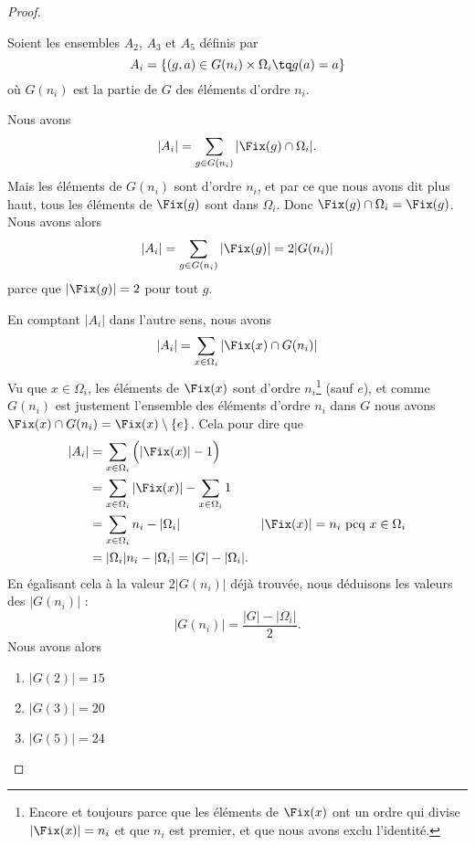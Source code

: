 \begin{proof}
\begin{subproof}
		Soient les ensembles \( A_2\), \( A_3\) et \( A_5\) définis par
		\begin{equation}
			A_i=\{ (g,a)\in G(n_i)\times \Omega_i\tq g(a)=a  \}
		\end{equation}
		où \( G(n_i)\) est la partie de \( G\) des éléments d'ordre \( n_i\).

		Nous avons
		\begin{equation}
			| A_i |=\sum_{g\in G(n_i)}| \Fix(g)\cap \Omega_i |.
		\end{equation}
		Mais les éléments de \( G(n_i)\) sont d'ordre \( n_i\), et par ce que nous avons dit plus haut, tous les éléments de \( \Fix(g)\) sont dans \( \Omega_i\). Donc \( \Fix(g)\cap \Omega_i=\Fix(g)\). Nous avons alors
		\begin{equation}
			| A_i |=\sum_{g\in G(n_i)}| \Fix(g) |=2|G(n_i)|
		\end{equation}
		parce que \( | \Fix(g) |=2\) pour tout \( g\).

		En comptant \( | A_i |\) dans l'autre sens, nous avons
		\begin{equation}        \label{EQooBHIIooVcGgFd}
			| A_i |=\sum_{x\in \Omega_i}|  \Fix(x)\cap G(n_i) |
		\end{equation}
		Vu que \( x\in \Omega_i\), les éléments de \( \Fix(x)\) sont d'ordre \( n_i\)\footnote{Encore et toujours parce que les éléments de \( \Fix(x)\) ont un ordre qui divise \( | \Fix(x) |=n_i\) et que \( n_i\) est premier, et que nous avons exclu l'identité.} (sauf \( e\)), et comme \( G(n_i)\) est justement l'ensemble des éléments d'ordre \( n_i\) dans \( G\) nous avons \( \Fix(x)\cap G(n_i) = \Fix(x)\setminus\{ e \}\). Cela pour dire que
		\begin{subequations}
			\begin{align}
				| A_i | & =\sum_{x\in \Omega_i}\Big( |\Fix(x)|-1\Big)                                                       \\
				        & =\sum_{x\in \Omega_i}| \Fix(x) |-\sum_{x\in \Omega_i}1                                            \\
				        & =\sum_{x\in \Omega_i}n_i-| \Omega_i |                  & | \Fix(x) |=n_i \text{ pcq }x\in\Omega_i \\
				        & =| \Omega_i |n_i-| \Omega_i |=| G |-| \Omega_i |.
			\end{align}
		\end{subequations}
		En égalisant cela à la valeur \( 2|G(n_i)|\) déjà trouvée, nous déduisons les valeurs des \( | G(n_i) |\) :
		\begin{equation}
			| G(n_i) |=\frac{ | G |-| \Omega_i | }{2}.
		\end{equation}
		Nous avons alors
		\begin{enumerate}
			\item
			      \( | G(2) |=15\)
			\item
			      \( | G(3) |=20\)
			\item
			      \( | G(5) |=24\)
		\end{enumerate}


\end{subproof}
\end{proof}
